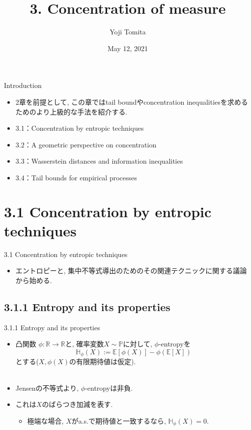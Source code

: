 \documentclass[aspectratio=169, dvipdfmx]{beamer}
\title{3. Concentration of measure}
\author{Yoji Tomita}
\date{May 12, 2021}
\newcommand{\ex}{\mathbb{E}}
\begin{document}
\maketitle


\begin{frame}{Introduction}
\begin{itemize}
    \item 2章を前提として, この章ではtail boundやconcentration inequalitiesを求めるためのより上級的な手法を紹介する.
    \item 3.1：Concentration by entropic techniques
    \item 3.2：A geometric perspective on concentration
    \item 3.3：Wasserstein distances and information inequalities
    \item 3.4：Tail bounds for empirical processes
\end{itemize}
\end{frame}

\section{3.1 Concentration by entropic techniques}

\begin{frame}{3.1 Concentration by entropic techniques}
\begin{itemize}
    \item エントロピーと, 集中不等式導出のためのその関連テクニックに関する議論から始める.
\end{itemize}
\end{frame}

\subsection{3.1.1 Entropy and its properties}
\begin{frame}{3.1.1 Entropy and its properties}
\begin{itemize}
    \item 凸関数 $\phi:\mathbb{R} \to \mathbb{R}$と, 確率変数$X\sim \mathbb{P}$に対して, $\phi$-entropyを
    \[\mathbb{H}_\phi(X) := \ex[\phi(X)] - \phi(\ex[X])\]
    とする($X, \phi(X)$の有限期待値は仮定).\\
    　
    \item Jensenの不等式より, $\phi$-entropyは非負.
    \item これは$X$のばらつき加減を表す.
    \begin{itemize}
        \item 極端な場合, $X$がa.s.で期待値と一致するなら, $\mathbb{H}_\phi(X) = 0$.
    \end{itemize}
\end{itemize}
\end{frame}
\end{document}
